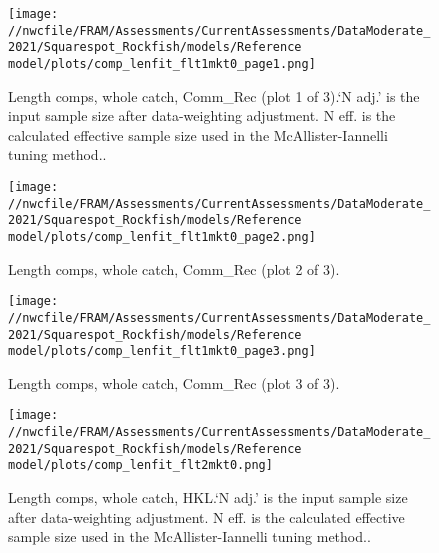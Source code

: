\documentclass[11pt,
  english,
  a4paper,
]{article}
\begin{document}
\leavevmode\tagmcend\tagstructend


\begin{figure}
\centering
\texttt{[image: //nwcfile/FRAM/Assessments/CurrentAssessments/DataModerate\_2021/Squarespot\_Rockfish/models/Reference model/plots/comp\_lenfit\_flt1mkt0\_page1.png]}
\caption{Length comps, whole catch, Comm\_Rec (plot 1 of 3).`N adj.' is the input sample size after data-weighting adjustment. N eff. is the calculated effective sample size used in the McAllister-Iannelli tuning method..\label{fig:comp_lenfit_flt1mkt0_page1}}
\end{figure}

\tagmcend\tagstructend


\begin{figure}
\centering
\texttt{[image: //nwcfile/FRAM/Assessments/CurrentAssessments/DataModerate\_2021/Squarespot\_Rockfish/models/Reference model/plots/comp\_lenfit\_flt1mkt0\_page2.png]}
\caption{Length comps, whole catch, Comm\_Rec (plot 2 of 3).\label{fig:comp_lenfit_flt1mkt0_page2}}
\end{figure}

\tagmcend\tagstructend


\begin{figure}
\centering
\texttt{[image: //nwcfile/FRAM/Assessments/CurrentAssessments/DataModerate\_2021/Squarespot\_Rockfish/models/Reference model/plots/comp\_lenfit\_flt1mkt0\_page3.png]}
\caption{Length comps, whole catch, Comm\_Rec (plot 3 of 3).\label{fig:comp_lenfit_flt1mkt0_page3}}
\end{figure}

\tagmcend\tagstructend


\begin{figure}
\centering
\texttt{[image: //nwcfile/FRAM/Assessments/CurrentAssessments/DataModerate\_2021/Squarespot\_Rockfish/models/Reference model/plots/comp\_lenfit\_flt2mkt0.png]}
\caption{Length comps, whole catch, HKL.`N adj.' is the input sample size after data-weighting adjustment. N eff. is the calculated effective sample size used in the McAllister-Iannelli tuning method..\label{fig:comp_lenfit_flt2mkt0}}
\end{figure}

\tagmcend\tagstructend
\end{document}

